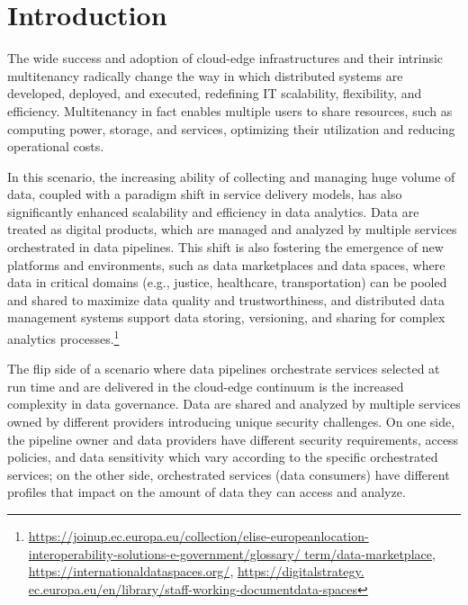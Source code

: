 \section{Introduction}
{\color{OurColor}The wide success and adoption of cloud-edge infrastructures and their intrinsic multitenancy radically change the way in which distributed systems are developed, deployed, and executed, redefining IT scalability, flexibility, and efficiency.} Multitenancy in fact enables multiple users to share resources, such as computing power, storage, and services, optimizing their utilization and reducing operational costs. 

{\color{OurColor}In this scenario, the increasing ability of collecting and managing huge volume of data, coupled with a paradigm shift in service delivery models, has also significantly enhanced scalability and efficiency in data analytics. Data are treated as digital products, which are managed and analyzed by multiple services orchestrated in data pipelines. This shift is also fostering the emergence of new platforms and environments, such as data marketplaces and data spaces, where data in critical domains (e.g., justice, healthcare, transportation) can be pooled and shared to maximize data quality and trustworthiness,
and distributed data management systems support data storing, versioning, and sharing for complex analytics processes.}\footnote{\url{https://joinup.ec.europa.eu/collection/elise-europeanlocation-
interoperability-solutions-e-government/glossary/
term/data-marketplace}, \url{https://internationaldataspaces.org/}, \url{https://digitalstrategy.
ec.europa.eu/en/library/staff-working-documentdata-spaces}}



The flip side of a scenario {\color{OurColor}where data pipelines orchestrate services selected at run time and are delivered in the cloud-edge continuum} is the increased complexity in data governance. {\color{OurColor}Data are shared and analyzed by multiple services owned by different providers introducing unique security challenges. On one side, the pipeline owner and data providers have different security requirements, access policies, and data sensitivity which vary according to the specific orchestrated services; on the other side, orchestrated services (data consumers) have different profiles that impact on the amount of data they can access and analyze.}

